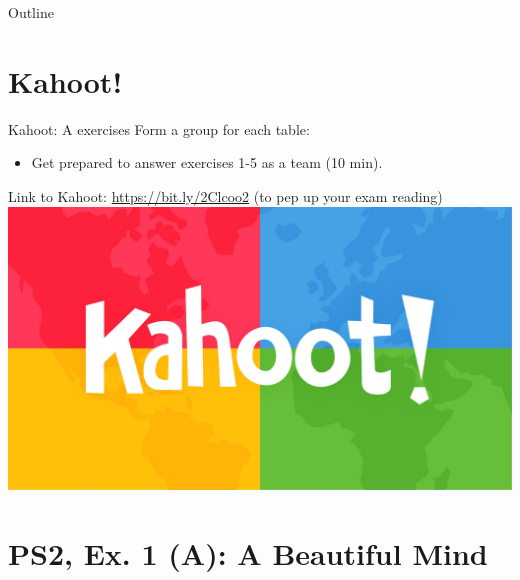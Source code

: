 

\maketitle

  \newcommand{\intuition}[1]{#1} %

\begin{frame}{Outline}
\tableofcontents
\end{frame}


\section{Kahoot!}

\begin{frame}{Kahoot: A exercises}
  Form a group for each table:
  \begin{itemize}
    \item Get prepared to answer exercises 1-5 as a team (10 min).
  \end{itemize}
  \intuition{Link to Kahoot: \href{https://bit.ly/2Clcoo2}{https://bit.ly/2Clcoo2} (to pep up your exam reading)}
  \includegraphics[width=\textwidth]{figures/kahoot}
\end{frame}


\section{PS2, Ex. 1 (A): A Beautiful Mind}

